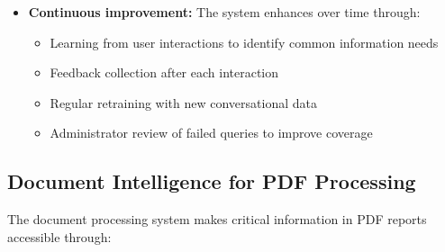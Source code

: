 \documentclass[12pt,a4paper]{report}
\begin{document}
\begin{itemize}
    \item \textbf{Continuous improvement:} The system enhances over time through:
    \begin{itemize}
        \item Learning from user interactions to identify common information needs
        \item Feedback collection after each interaction
        \item Regular retraining with new conversational data
        \item Administrator review of failed queries to improve coverage
    \end{itemize}
\end{itemize}

\subsection{Document Intelligence for PDF Processing}
\indent \indent The document processing system makes critical information in PDF reports accessible through:
\end{document}
